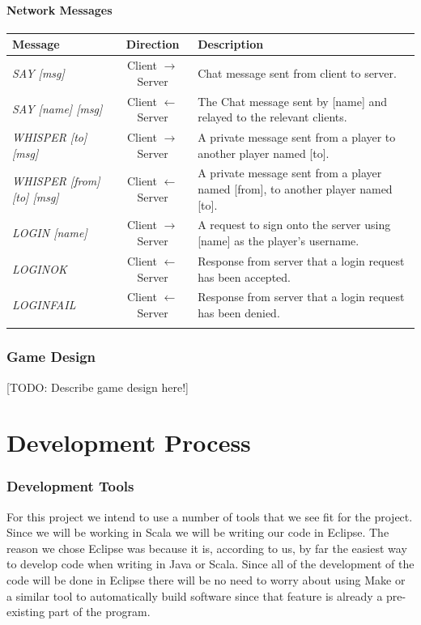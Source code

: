 \documentclass[a4paper]{article}
\begin{document}
\subsection{Network Messages}
\begin{center}
\begin{tabular}{|l|c|l|}
\hline
Message & Direction & Description\\
\hline
\textit{SAY [msg]} & Client $\rightarrow$ Server & Chat message sent from client to server.\\
\hline
\textit{SAY [name] [msg]} & Client $\leftarrow$ Server & The Chat message sent by [name] and relayed to the relevant clients.\\
\hline
\textit{WHISPER [to] [msg]} & Client $\rightarrow$ Server & A private message sent from a player to another player named [to].\\
\hline
\textit{WHISPER [from] [to] [msg]} & Client $\leftarrow$ Server & A private message sent from a player named [from], to another player named [to].\\
\hline
\textit{LOGIN [name]} & Client $\rightarrow$ Server & A request to sign onto the server using [name] as the player's username.\\
\hline
\textit{LOGINOK} & Client $\leftarrow$ Server & Response from server that a login request has been accepted.\\
\hline
\textit{LOGINFAIL} & Client $\leftarrow$ Server & Response from server that a login request has been denied.\\
\hline
[TODO: & Insert the rest & of the messages.]\\
\hline
\end{tabular}
\end{center}
\section{Game Design}
[TODO: Describe game design here!]
\part{Development Process}
\section{Development Tools}
For this project we intend to use a number of tools that we see fit for the project.
Since we will be working in Scala we will be writing our code in Eclipse. The reason we chose Eclipse was because it is, according to us, by far the easiest way to develop code when writing in Java or Scala. Since all of the development of the code will be done in Eclipse there will be no need to worry about using Make or a similar tool to automatically build software since that feature is already a pre-existing part of the program.
 
\end{document}
